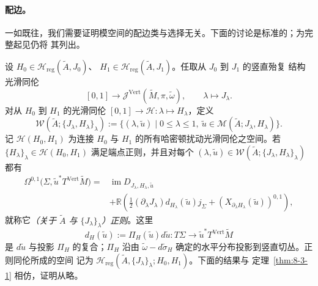 \paragraph{配边。}
一如既往，我们需要证明模空间的配边类与选择无关。下面的讨论是标准的；为完整起见仍将
其列出。

设
$H_0\in\mathcal H_{\mathrm{reg}}(\widetilde A,J_0)$、
$H_1\in\mathcal H_{\mathrm{reg}}(\widetilde A,J_1)$。任取从 $J_0$ 到 $J_1$ 的竖直殆复
结构光滑同伦
\[
  [0,1]\longrightarrow
  \mathcal J^{\mathrm{Vert}}(\widetilde M,\pi,\widetilde\omega),
  \qquad \lambda\longmapsto J_\lambda.
\]
对从 $H_0$ 到 $H_1$ 的光滑同伦
$[0,1]\to\mathcal H:\lambda\mapsto H_\lambda$，定义
\[
  \mathcal W(\widetilde A;\{J_\lambda,H_\lambda\}_\lambda)
  :=\bigl\{(\lambda,\widetilde u)\mid 0\le\lambda\le1,\
  \widetilde u\in\mathcal M(\widetilde A;J_\lambda,H_\lambda)\bigr\}.
\]
记 $\mathcal H(H_0,H_1)$ 为连接 $H_0$ 与 $H_1$ 的所有哈密顿扰动光滑同伦之空间。若
$\{H_\lambda\}_\lambda\in\mathcal H(H_0,H_1)$ 满足端点正则，并且对每个
$(\lambda,\widetilde u)\in
\mathcal W(\widetilde A;\{J_\lambda,H_\lambda\}_\lambda)$ 都有
\[
\begin{split}
  \Omega^{0,1}\bigl(\Sigma,\widetilde u^*T^{\mathrm{Vert}}\widetilde M\bigr)
  ={}&\operatorname{im}D_{J_\lambda,H_\lambda,\widetilde u}\\
  &+\mathbb R\left(
  \frac12(\partial_\lambda J_\lambda)
    d_{H_\lambda}(\widetilde u)j_\Sigma
  +(X_{\partial_\lambda H_\lambda}(\widetilde u))^{0,1}\right),
\end{split}
\]
就称它\emph{（关于 $\widetilde A$ 与 $\{J_\lambda\}_\lambda$）正则}。这里
\[
  d_H(\widetilde u):=\Pi_H(\widetilde u)d\widetilde u:
  T\Sigma\longrightarrow\widetilde u^*T^{\mathrm{Vert}}\widetilde M
\]
是 $d\widetilde u$ 与投影 $\Pi_H$ 的复合；$\Pi_H$ 沿由
$\widetilde\omega-d\widetilde\sigma_H$ 确定的水平分布投影到竖直切丛。正则同伦所成的空间
记为
$\mathcal H_{\mathrm{reg}}(\widetilde A,\{J_\lambda\}_\lambda;H_0,H_1)$。下面的结果与
定理~\ref{thm:8-3-1} 相仿，证明从略。

